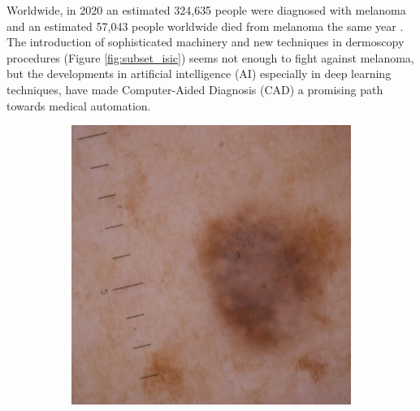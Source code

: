 Worldwide, in 2020 an estimated 324,635 people were diagnosed with melanoma and
an estimated 57,043 people worldwide died from melanoma the same year
\cite{CancerStats}. The introduction of sophisticated machinery and new
techniques in dermoscopy procedures (Figure \ref{fig:subset_isic}) seems not
enough to fight against melanoma, but the developments in artificial
intelligence (AI) especially in deep learning techniques, have made
Computer-Aided Diagnosis (CAD) a promising path towards
medical automation.

\begin{figure}[H] \centering
  \begin{subfigure}{0.3\textwidth}
    \includegraphics[width=\textwidth]{imatges/introduction/subset_isic/ISIC_1752943.jpg}
  \end{subfigure}
  \hfill
  \begin{subfigure}{0.3\textwidth}

\end{subfigure}
\end{figure}
